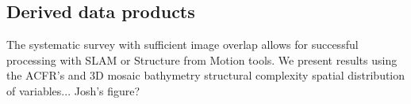 \subsection{Derived data products}
The systematic survey with sufficient image overlap allows for successful processing with SLAM or Structure from Motion tools. We present results using the ACFR's \cite{Mahon_2008} and \cite{Johnson_Roberson_2010}\cite{Johnson_Roberson_2010} 
3D mosaic
bathymetry
structural complexity
spatial distribution of variables... Josh's figure?
